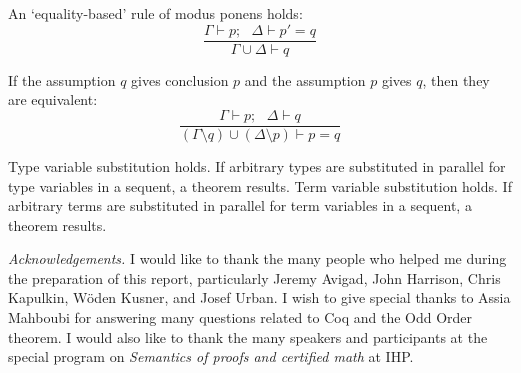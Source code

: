 \documentclass[brochure,english,12pt]{bourbaki}
\theoremstyle{plain}
\begin{document}
\noindent
An `equality-based' rule of modus ponens holds:
$$
\frac{\Gamma\vdash p;~~~\Delta \vdash p'=q}
{\Gamma\cup \Delta \vdash q}
$$

\noindent
If the assumption $q$ gives conclusion $p$ and the assumption $p$
gives $q$, then they are equivalent:
$$
\frac{\Gamma \vdash p;~~~\Delta\vdash q}
{(\Gamma\setminus q)\cup (\Delta\setminus p)
\vdash p=q}
$$

Type variable substitution holds.  If arbitrary types are substituted
in parallel for type variables in a sequent, a theorem results.  Term
variable substitution holds.  If arbitrary terms are substituted in
parallel for term variables in a sequent, a theorem results.







{\it Acknowledgements.}   I would like to thank the many people who helped me
during the preparation of this report, particularly Jeremy Avigad, John Harrison, Chris Kapulkin, 
W\"oden Kusner,  and Josef Urban.  I wish to give special thanks to Assia Mahboubi for answering many questions related
to Coq and the Odd Order theorem.
I would also like to thank the many speakers and participants at the special program on {\it Semantics of proofs and certified 
math} at IHP.

\raggedright
%

\end{document}
